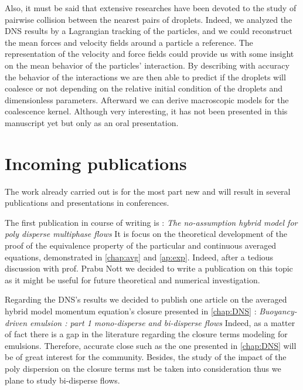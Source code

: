 Also, it must be said that extensive researches have been devoted to the study of pairwise collision between the nearest pairs of droplets.
Indeed, we analyzed the DNS results by a Lagrangian tracking of the particles, and we could reconstruct the mean forces and velocity fields around a particle a reference. 
The representation of the velocity and force fields could provide us with some insight on the mean behavior of the particles' interaction. 
By describing with accuracy the behavior of the interactions we are then able to predict if the droplets will coalesce or not depending on the relative initial condition of the droplets and dimensionless parameters. 
Afterward we can derive macroscopic models for the coalescence kernel. 
Although very interesting, it has not been presented in this manuscript yet but only as an oral presentation. 

\section*{Incoming publications}

The work already carried out  is for the most part new and will result in several publications and presentations in conferences. 

The first publication in course of writing is : \textit{The no-assumption hybrid model for poly disperse multiphase flows}
It is focus on the theoretical development of the proof of the equivalence property of the particular and continuous averaged equations, demonstrated in \ref{chap:avg} and \ref{ap:exp}. 
Indeed, after a tedious discussion with prof. Prabu Nott we decided to write a publication on this topic as it might be useful for future theoretical and numerical investigation. 

Regarding the DNS's results we decided to publish one article on the averaged hybrid model momentum  equation's closure presented in \ref{chap:DNS} : \textit{Buoyancy-driven emulsion : part 1 mono-disperse and bi-disperse flows}
Indeed, as a matter of fact there is a gap in the literature regarding the closure terms modeling for emulsions. 
Therefore, accurate close such as the one presented in \ref{chap:DNS} will be of great interest for the community. 
Besides, the study of the impact of the poly dispersion on the closure terms mst be taken into consideration thus we plane to study bi-disperse flows.

